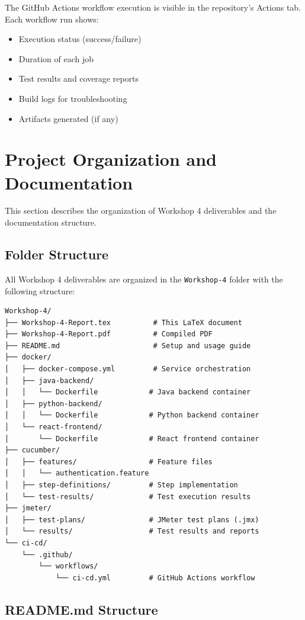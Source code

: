 \documentclass[12pt,a4paper]{article}
\begin{document}
The GitHub Actions workflow execution is visible in the repository's Actions tab. Each workflow run shows:
\begin{itemize}
    \item Execution status (success/failure)
    \item Duration of each job
    \item Test results and coverage reports
    \item Build logs for troubleshooting
    \item Artifacts generated (if any)
\end{itemize}

\section{Project Organization and Documentation}

This section describes the organization of Workshop 4 deliverables and the documentation structure.

\subsection{Folder Structure}

All Workshop 4 deliverables are organized in the \texttt{Workshop-4} folder with the following structure:

\begin{lstlisting}[caption={Workshop-4 Folder Structure}]
Workshop-4/
├── Workshop-4-Report.tex          # This LaTeX document
├── Workshop-4-Report.pdf          # Compiled PDF
├── README.md                      # Setup and usage guide
├── docker/
│   ├── docker-compose.yml         # Service orchestration
│   ├── java-backend/
│   │   └── Dockerfile            # Java backend container
│   ├── python-backend/
│   │   └── Dockerfile            # Python backend container
│   └── react-frontend/
│       └── Dockerfile            # React frontend container
├── cucumber/
│   ├── features/                 # Feature files
│   │   └── authentication.feature
│   ├── step-definitions/         # Step implementation
│   └── test-results/             # Test execution results
├── jmeter/
│   ├── test-plans/               # JMeter test plans (.jmx)
│   └── results/                  # Test results and reports
└── ci-cd/
    └── .github/
        └── workflows/
            └── ci-cd.yml         # GitHub Actions workflow
\end{lstlisting}

\subsection{README.md Structure}
\end{document}
